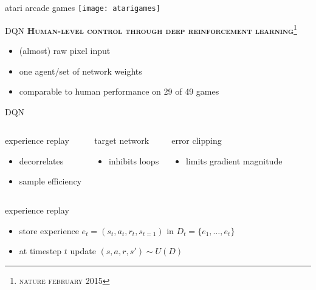 \begin{frame}{atari arcade games}
\texttt{[image: atarigames]}
\end{frame}


\begin{frame}{DQN}
   \textbf{\textsc{Human-level control through deep reinforcement learning}}\footnote{\textsc{nature february  2015}}
\begin{itemize}
    \item (almost) raw pixel input
    \item one agent/set of network weights
    \item comparable to human performance on 29 of 49 games
\end{itemize}
\end{frame}

\begin{frame}{DQN}
      \begin{columns}[T,onlytextwidth]

          \begin{block}{experience replay}
            \begin{itemize}
                \item decorrelates
                \item sample efficiency
            \end{itemize}
      \end{block}


          \begin{block}{target network}
            \begin{itemize}
                \item inhibits loops
            \end{itemize}
      \end{block}
          \begin{block}{error clipping}
            \begin{itemize}
                \item limits gradient magnitude
            \end{itemize}
      \end{block}

  \end{columns}
\end{frame}

\begin{frame}{experience replay}

    
        \begin{itemize}
        \item store experience $e_t=(s_t,a_t,r_t,s_{t=1})$ in $D_t=\{e_1,\dots,e_t\}$
        \item at timestep $t$ update $(s,a,r,s')\sim U(D)$
        \end{itemize}
      

\end{frame}


